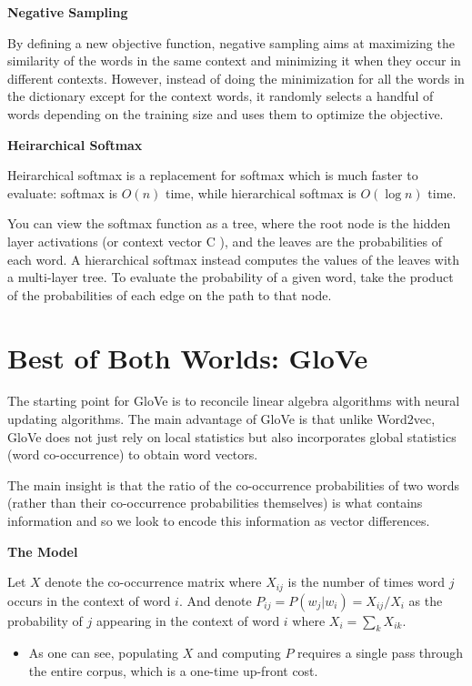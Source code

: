 \documentclass[
]{book}
\providecommand{\tightlist}{%
  \setlength{\itemsep}{0pt}\setlength{\parskip}{0pt}}
\begin{document}
\textbf{Negative Sampling}

By defining a new objective function, negative sampling aims at maximizing the similarity of the words in the same context and minimizing it when they occur in different contexts. However, instead of doing the minimization for all the words in the dictionary except for the context words, it randomly selects a handful of words depending on the training size and uses them to optimize the objective.

\textbf{Heirarchical Softmax}

Heirarchical softmax is a replacement for softmax which is much faster to evaluate: softmax is \(O(n)\) time, while hierarchical softmax is \(O(\log n)\) time.

You can view the softmax function as a tree, where the root node is the hidden layer activations (or context vector C ), and the leaves are the probabilities of each word. A hierarchical softmax instead computes the values of the leaves with a multi-layer tree. To evaluate the probability of a given word, take the product of the probabilities of each edge on the path to that node.

\hypertarget{best-of-both-worlds-glove}{%
\section{Best of Both Worlds: GloVe}\label{best-of-both-worlds-glove}}

The starting point for GloVe is to reconcile linear algebra algorithms with neural updating algorithms. The main advantage of GloVe is that unlike Word2vec, GloVe does not just rely on local statistics but also incorporates global statistics (word co-occurrence) to obtain word vectors.

The main insight is that the ratio of the co-occurrence probabilities of two words (rather than their co-occurrence probabilities themselves) is what contains information and so we look to encode this information as vector differences.

\textbf{The Model}

Let \(X\) denote the co-occurrence matrix where \(X_{ij}\) is the number of times word \(j\) occurs in the context of word \(i\). And denote \(P_{ij} = P(w_j | w_i) = X_{ij} / X_i\) as the probability of \(j\) appearing in the context of word \(i\) where \(X_i = \sum_{k} X_{ik}\).

\begin{itemize}
\tightlist
\item
  As one can see, populating \(X\) and computing \(P\) requires a single pass through the entire corpus, which is a one-time up-front cost.
\end{itemize}
\end{document}
